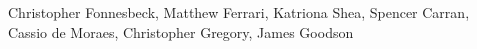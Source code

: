 Christopher Fonnesbeck, Matthew Ferrari, Katriona Shea, Spencer Carran, Cassio de Moraes, Christopher Gregory, James Goodson